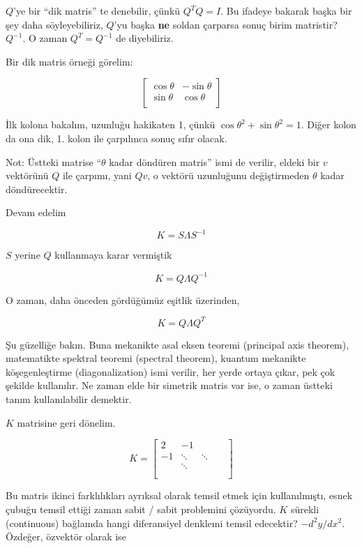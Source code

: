 \documentclass[12pt,fleqn]{article}\usepackage{../../common}
\begin{document}
$Q$'ye bir ``dik matris'' te denebilir, çünkü $Q^TQ = I$. Bu ifadeye
bakarak başka bir şey daha söyleyebiliriz, $Q$'yu başka \textbf{ne} soldan
çarparsa sonuç birim matristir? $Q^{-1}$. O zaman $Q^T = Q^{-1}$ de
diyebiliriz.

Bir dik matris örneği görelim:

$$ 
\left[\begin{array}{cc}
\cos \theta & -\sin \theta \\
\sin \theta & \cos \theta \\
\end{array}\right]
 $$

İlk kolona bakalım, uzunluğu hakikaten 1, çünkü $\cos \theta ^2 + \sin \theta
^2 = 1$. Diğer kolon da ona dik, 1. kolon ile çarpılınca sonuç sıfır olacak. 

Not: Üstteki matrise ``$\theta$ kadar döndüren matris'' ismi de verilir,
eldeki bir $v$ vektörünü $Q$ ile çarpımı, yani $Qv$, o vektörü uzunluğunu
değiştirmeden $\theta$ kadar döndürecektir.

Devam edelim

$$ K = S \Lambda S^{-1} $$

$S$ yerine $Q$ kullanmaya karar vermiştik

$$  K = Q \Lambda Q^{-1} $$

O zaman, daha önceden gördüğümüz eşitlik üzerinden, 

$$  K = Q \Lambda Q^{T} $$

Şu güzelliğe bakın. Buna mekanikte asal eksen teoremi (principal axis theorem),
matematikte spektral teoremi (spectral theorem), kuantum mekanikte
köşegenleştirme (diagonalization) ismi verilir, her yerde ortaya çıkar, pek çok
şekilde kullanılır. Ne zaman elde bir simetrik matris var ise, o zaman üstteki
tanım kullanılabilir demektir.

$K$ matrisine geri dönelim. 

$$ 
K =
\left[\begin{array}{rrrrr}
2 & -1 &&& \\
-1 & \ddots & \ddots && \\
& \ddots &&& \\
&&&& \\
&&&& 
\end{array}\right]
 $$

Bu matris ikinci farklılıkları ayrıksal olarak temsil etmek için
kullanılmıştı, esnek çubuğu temsil ettiği zaman sabit / sabit problemini
çözüyordu. $K$ sürekli (continuous) bağlamda hangi diferansiyel
denklemi temsil edecektir? $-d^2y/dx^2$.  Özdeğer, özvektör olarak ise
\end{document}
